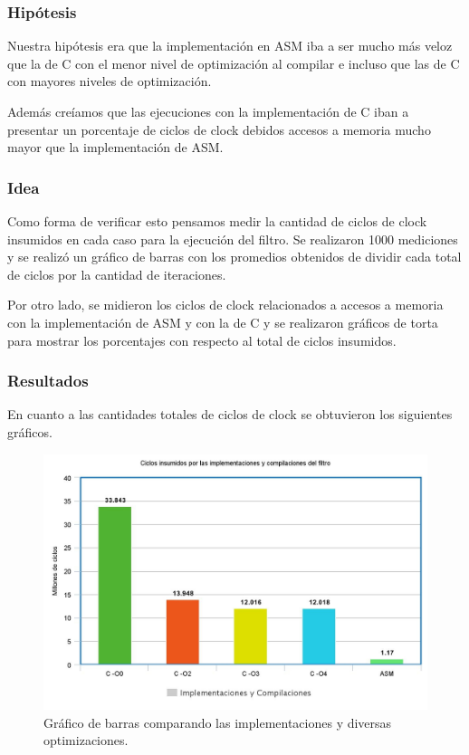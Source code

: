 \subsubsection{Hipótesis}
\par{Nuestra hipótesis era que la implementación en ASM iba a ser mucho más veloz que la de C con el menor nivel de optimización al compilar e incluso que las de C con mayores niveles de optimización.}
\par{Además creíamos que las ejecuciones con la implementación de C iban a presentar un porcentaje de ciclos de clock debidos accesos a memoria mucho mayor que la implementación de ASM.}

\subsubsection{Idea}
\par{Como forma de verificar esto pensamos medir la cantidad de ciclos de clock insumidos en cada caso para la ejecución del filtro. Se realizaron 1000 mediciones y se realizó un gráfico de barras con los promedios obtenidos de dividir cada total de ciclos por la cantidad de iteraciones.}
\par{Por otro lado, se midieron los ciclos de clock relacionados a accesos a memoria con la implementación de ASM y con la de C y se realizaron gráficos de torta para mostrar los porcentajes con respecto al total de ciclos insumidos.}

\subsubsection{Resultados}
\par{En cuanto a las cantidades totales de ciclos de clock se obtuvieron los siguientes gráficos.}

\begin{figure}[h!]
\centering
\captionsetup{justification=centering}
	\includegraphics[width = 12 cm, height = 8 cm]{imagenes/CombinarASM-Cs.jpeg}
	\caption[center]{Gráfico de barras comparando las implementaciones y diversas optimizaciones.}
\end{figure}

